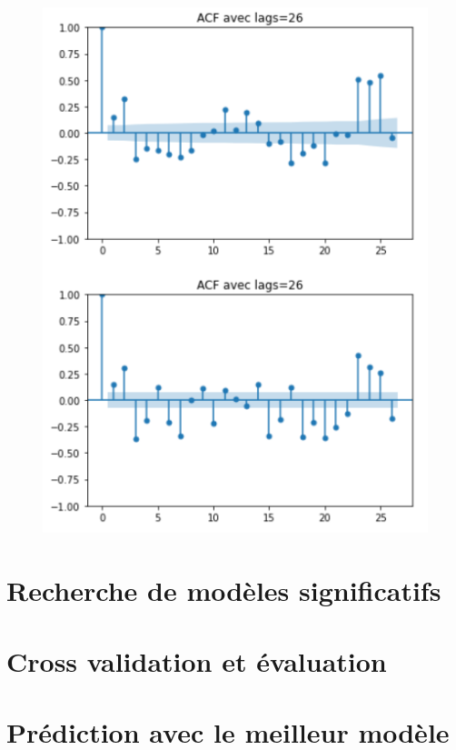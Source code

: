 \documentclass{beamer}
\theoremstyle{definition}
\begin{document}
\begin{frame}
\begin{minipage}[t]{1\linewidth}
\begin{minipage}[c]{0.48\linewidth}
\begin{figure}
\begin{center}
					\includegraphics[width=0.75\linewidth]{12.png}			
				\end{center}
				
		\end{figure}\end{minipage}
	\end{minipage}
	
\end{frame}


\section{Recherche de modèles significatifs}
\section{Cross validation et évaluation}
\section{Prédiction avec le meilleur modèle}
\end{document}
